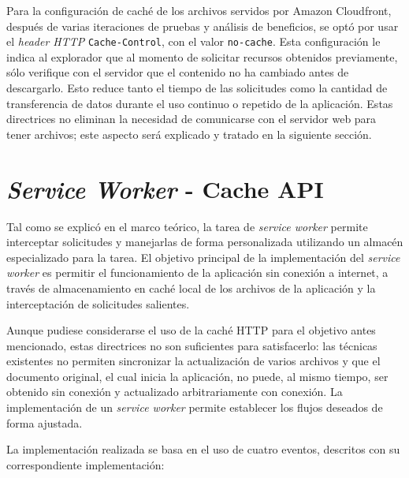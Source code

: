 Para la configuración de caché de los archivos servidos por Amazon Cloudfront, después de varias iteraciones de pruebas y análisis de beneficios, se optó por usar el \textit{header HTTP} \texttt{Cache-Control}, con el valor \texttt{no-cache}. Esta configuración le indica al explorador que al momento de solicitar recursos obtenidos previamente, sólo verifique con el servidor que el contenido no ha cambiado antes de descargarlo. Esto reduce tanto el tiempo de las solicitudes como la cantidad de transferencia de datos durante el uso continuo o repetido de la aplicación. Estas directrices no eliminan la necesidad de comunicarse con el servidor web para tener archivos; este aspecto será explicado y tratado en la siguiente sección.

\section{\textit{Service Worker} - Cache API}

Tal como se explicó en el marco teórico, la tarea de \textit{service worker} permite interceptar solicitudes y manejarlas de forma personalizada utilizando un almacén especializado para la tarea. El objetivo principal de la implementación del \textit{service worker} es permitir el funcionamiento de la aplicación sin conexión a internet, a través de almacenamiento en caché local de los archivos de la aplicación y la interceptación de solicitudes salientes.

Aunque pudiese considerarse el uso de la caché HTTP para el objetivo antes mencionado, estas directrices no son suficientes para satisfacerlo: las técnicas existentes no permiten sincronizar la actualización de varios archivos y que el documento original, el cual inicia la aplicación, no puede, al mismo tiempo, ser obtenido sin conexión y actualizado arbitrariamente con conexión. La implementación de un \textit{service worker} permite establecer los flujos deseados de forma ajustada.

La implementación realizada se basa en el uso de cuatro eventos, descritos con su correspondiente implementación:

